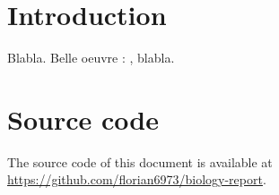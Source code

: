 \documentclass{article}
\begin{document}
    

    \section{Introduction}

    Blabla. Belle oeuvre : \autocite{zhangMulticladeEnvGag2021}, blabla.
    
    \newpage

    \appendix

    \section {Source code}
    The source code of this document is available at \url{https://github.com/florian6973/biology-report}.
    
    \nocite{*}
    \printbibliography
    
\end{document}
